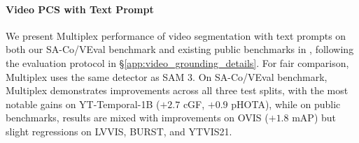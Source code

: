 \paragraph{Video PCS with Text Prompt} 
We present \model Multiplex performance of video segmentation with text prompts on both our SA-Co/VEval benchmark and existing public benchmarks in , following the evaluation protocol in \S\ref{app:video_grounding_details}. For fair comparison, \model Multiplex uses the same detector as SAM 3.
On SA-Co/VEval benchmark, \model Multiplex demonstrates improvements across all three test splits, with the most notable gains on YT-Temporal-1B ($+2.7$ cGF, $+0.9$ pHOTA), while on public benchmarks, results are mixed with improvements on OVIS ($+1.8$ mAP) but slight regressions on LVVIS, BURST, and YTVIS21. 

